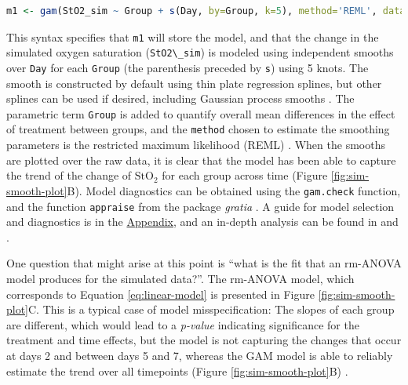 \documentclass[Royal,times,doublespace,sagev]{sagej}
\newcommand{\passthrough}[1]{#1}
\begin{document}
\begin{lstlisting}[language=R]
m1 <- gam(StO2_sim ~ Group + s(Day, by=Group, k=5), method='REML', data = dat_sim)
\end{lstlisting}

This syntax specifies that \passthrough{\lstinline!m1!} will store the model, and that the change in the simulated oxygen saturation (\passthrough{\lstinline!StO2\_sim!}) is modeled using independent smooths over \passthrough{\lstinline!Day!} for each \passthrough{\lstinline!Group!} (the parenthesis preceded by \passthrough{\lstinline!s!}) using 5 knots. The smooth is constructed by default using thin plate regression splines, but other splines can be used if desired, including Gaussian process smooths \cite{simpson2018}. The parametric term \passthrough{\lstinline!Group!} is added to quantify overall mean differences in the effect of treatment between groups, and the \passthrough{\lstinline!method!} chosen to estimate the smoothing parameters is the restricted maximum likelihood (REML) \cite{wood2017}. When the smooths are plotted over the raw data, it is clear that the model has been able to capture the trend of the change of \(\mbox{StO}_2\) for each group across time (Figure \ref{fig:sim-smooth-plot}B). Model diagnostics can be obtained using the \passthrough{\lstinline!gam.check!} function, and the function \passthrough{\lstinline!appraise!} from the package \emph{gratia} \cite{gratia}. A guide for model selection and diagnostics is in the \protect\hyperlink{workflow}{Appendix}, and an in-depth analysis can be found in \cite{wood2017} and \cite{harezlak2018}.

One question that might arise at this point is ``what is the fit that an rm-ANOVA model produces for the simulated data?''. The rm-ANOVA model, which corresponds to Equation \eqref{eq:linear-model} is presented in Figure \ref{fig:sim-smooth-plot}C. This is a typical case of model misspecification: The slopes of each group are different, which would lead to a \emph{p-value} indicating significance for the treatment and time effects, but the model is not capturing the changes that occur at days 2 and between days 5 and 7, whereas the GAM model is able to reliably estimate the trend over all timepoints (Figure \ref{fig:sim-smooth-plot}B) .
\end{document}
